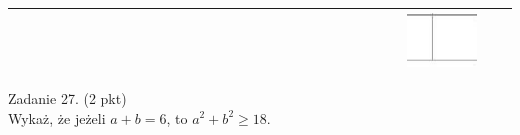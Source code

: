 \documentclass[10pt]{article}
\begin{document}
\begin{center}
\begin{tabular}{|c|c|c|c|c|c|c|c|c|c|c|c|c|c|c|c|c|c|c|c|c|c|c|c|c|c|c|c|c|c|c|}
\hline
 &  &  &  &  &  &  &  &  &  &  &  &  &  &  &  &  &  &  &  &  &  &  &  &  &  &  &  & \includegraphics[max width=\textwidth]{2024_11_21_87037534e5fdc524263ag-08}
 &  &  \\
\hline
\end{tabular}
\end{center}

Zadanie 27. (2 pkt)\\
Wykaż, że jeżeli \(a+b=6\), to \(a^{2}+b^{2} \geq 18\).
\end{document}
